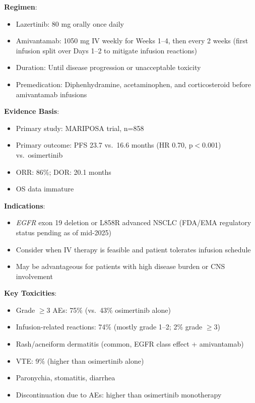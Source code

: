 \documentclass[10pt,letterpaper]{article}
\begin{document}
\begin{tcolorbox}[enhanced,colback=conditionalyellow!10,colframe=conditionalyellow,
title={\textbf{Option 3: Amivantamab + Lazertinib} \hfill \colorbox{white}{\textbf{CONDITIONAL (1B)}}},
fonttitle=\bfseries\small,coltitle=black]
{\small
\textbf{Regimen}:
\begin{itemize}
\item Lazertinib: 80 mg orally once daily
\item Amivantamab: 1050 mg IV weekly for Weeks 1--4, then every 2 weeks (first infusion split over Days 1--2 to mitigate infusion reactions)
\item Duration: Until disease progression or unacceptable toxicity
\item Premedication: Diphenhydramine, acetaminophen, and corticosteroid before amivantamab infusions
\end{itemize}

\textbf{Evidence Basis}:
\begin{itemize}
\item Primary study: MARIPOSA trial, n=858
\item Primary outcome: PFS 23.7 vs.~16.6 months (HR 0.70, p$<$0.001) vs.~osimertinib
\item ORR: 86\%; DOR: 20.1 months
\item OS data immature
\end{itemize}

\textbf{Indications}:
\begin{itemize}
\item \textit{EGFR} exon 19 deletion or L858R advanced NSCLC (FDA/EMA regulatory status pending as of mid-2025)
\item Consider when IV therapy is feasible and patient tolerates infusion schedule
\item May be advantageous for patients with high disease burden or CNS involvement
\end{itemize}

\textbf{Key Toxicities}:
\begin{itemize}
\item Grade $\geq$3 AEs: 75\% (vs.~43\% osimertinib alone)
\item Infusion-related reactions: 74\% (mostly grade 1--2; 2\% grade $\geq$3)
\item Rash/acneiform dermatitis (common, EGFR class effect + amivantamab)
\item VTE: 9\% (higher than osimertinib alone)
\item Paronychia, stomatitis, diarrhea
\item Discontinuation due to AEs: higher than osimertinib monotherapy
\end{itemize}

}
\end{tcolorbox}
\end{document}
